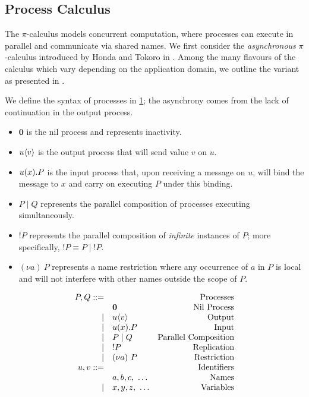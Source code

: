 \subsection{Process Calculus}
\label{subsection:picalculus}

The $\pi$-calculus models concurrent computation, 
where processes can execute in parallel and communicate 
via shared names.
We first consider the \textit{asynchronous} 
$\pi$-calculus introduced by 
Honda and Tokoro in \cite{AsyncHonda}.
Among the many flavours of the calculus 
which vary depending on the application domain,
we outline the variant as presented in \cite{C406Lecture}. 

We define the syntax of processes in \cref{fig:async};
the asynchrony comes from the lack of 
continuation in the output process.

\begin{itemize}
\item $\mathbf{0}$ is the nil process and represents inactivity.
\item ${{u}\langle {v} \rangle}$ is the output process that will send value $v$ on $u$.
\item ${{u}({x})}.P$ is the input process that,
 upon receiving a message on $u$, 
 will bind the message to $x$ and 
 carry on executing $P$ under this binding.
\item $P\mid Q$ represents the parallel composition of 
processes executing simultaneously.
\item $!P$ represents the parallel composition of 
\textit{infinite} instances of $P$; 
more specifically, $!P \equiv P \mid {!P}$.
\item $(\nu a)~P$ represents a name restriction 
where any occurrence of $a$ in $P$ is local
 and will not interfere with other names outside the scope of $P$.
\end{itemize}

\begin{figure}[!hb]
\doublespacing
\[
\begin{array}{rlr}

P,Q ::= & & \text{Processes} \\
     & \mathbf{0} & \text{Nil Process} \\
\mid & {{u}\langle {v} \rangle} & \text{Output} \\
\mid & {{u}({x})}.P & \text{Input} \\     
\mid & P \mid Q & \text{Parallel Composition} \\
\mid & !P & \text{Replication} \\
\mid & (\nu a)~P & \text{Restriction} \\

u,v ::= & & \text{Identifiers} \\
     & a, b, c,~\dots & \text{Names} \\
\mid & x, y, z,~\dots & \text{Variables} \\

\end{array}
\]
\singlespacing
{}
\label{fig:async}
\end{figure}

